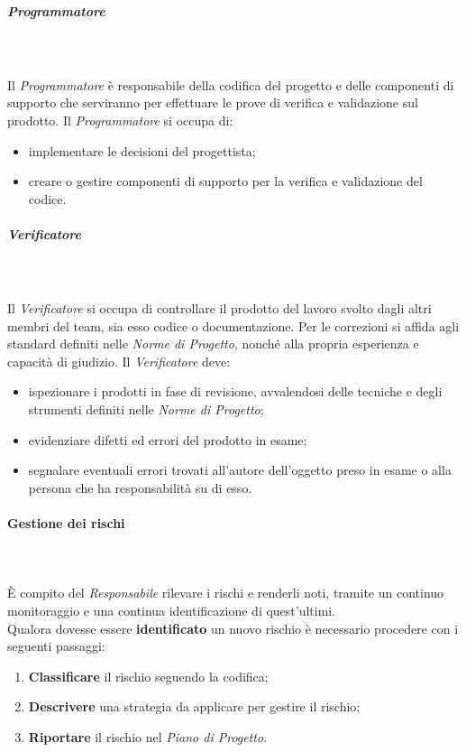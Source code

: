 \subparagraph*{Programmatore}\mbox{} \\ \mbox{} \\
Il \textit{Programmatore} è responsabile della codifica del progetto e delle componenti di supporto che serviranno per effettuare le prove di verifica e validazione sul prodotto.
Il \textit{Programmatore} si occupa di:
\begin{itemize}
	\item implementare le decisioni del progettista;
	\item creare o gestire componenti di supporto per la verifica e validazione del codice.
\end{itemize}

\subparagraph*{Verificatore}\mbox{} \\ \mbox{} \\
Il \textit{Verificatore} si occupa di controllare il prodotto del lavoro svolto dagli altri membri del team, sia esso codice o documentazione. Per le correzioni si affida agli standard definiti nelle \textit{Norme di Progetto}, nonché alla propria esperienza e capacità di giudizio.
Il \textit{Verificatore} deve:
\begin{itemize}
	\item ispezionare i prodotti in fase di revisione, avvalendosi delle tecniche e degli strumenti definiti nelle \textit{Norme di Progetto};
	\item evidenziare difetti ed errori del prodotto in esame;
	\item segnalare eventuali errori trovati all'autore dell'oggetto preso in esame o alla persona che ha responsabilità su di esso.
\end{itemize}

\paragraph{Gestione dei rischi}\mbox{} \\ \mbox{} \\
È compito del \textit{Responsabile} rilevare i rischi e renderli noti, tramite un continuo monitoraggio e una continua identificazione di quest'ultimi. \\
Qualora dovesse essere \textbf{identificato} un nuovo rischio è necessario procedere con i seguenti passaggi:
\begin{enumerate}
	\item \textbf{Classificare} il rischio seguendo la codifica;
	\item \textbf{Descrivere} una strategia da applicare per gestire il rischio;
	\item \textbf{Riportare} il rischio nel \textit{Piano di Progetto}.
\end{enumerate}

